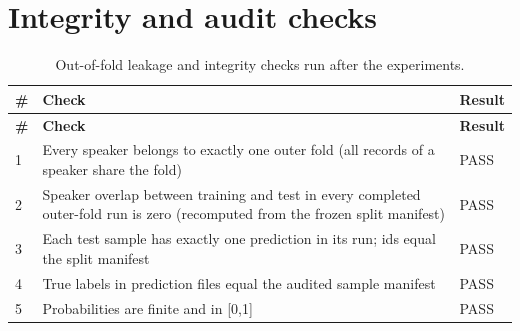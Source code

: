 \documentclass[11pt,a4paper]{article}
\begin{document}
\section{Integrity and audit checks}\label{sec:app-audit}
\begin{center}\scriptsize\renewcommand{\arraystretch}{1.15}
\begin{longtable}{>{\raggedleft\arraybackslash}p{1.55cm}>{\raggedright\arraybackslash}p{12.14cm}>{\raggedright\arraybackslash}p{1.55cm}}
\caption{Out-of-fold leakage and integrity checks run after the experiments.}\\
\toprule
\textbf{\hspace{0pt}\#} & \textbf{\hspace{0pt}Check} & \textbf{\hspace{0pt}Result}\\\midrule\endfirsthead
\toprule
\textbf{\hspace{0pt}\#} & \textbf{\hspace{0pt}Check} & \textbf{\hspace{0pt}Result}\\\midrule\endhead
\bottomrule\endfoot
\hspace{0pt}1 & \hspace{0pt}Every speaker belongs to exactly one outer fold (all records of a speaker share the fold) & \hspace{0pt}PASS\\
\hspace{0pt}2 & \hspace{0pt}Speaker overlap between training and test in every completed outer-fold run is zero (recomputed from the frozen split manifest) & \hspace{0pt}PASS\\
\hspace{0pt}3 & \hspace{0pt}Each test sample has exactly one prediction in its run; ids equal the split manifest & \hspace{0pt}PASS\\
\hspace{0pt}4 & \hspace{0pt}True labels in prediction files equal the audited sample manifest & \hspace{0pt}PASS\\
\hspace{0pt}5 & \hspace{0pt}Probabilities are finite and in [0,1] & \hspace{0pt}PASS\\

\end{longtable}
\end{center}
\end{document}
